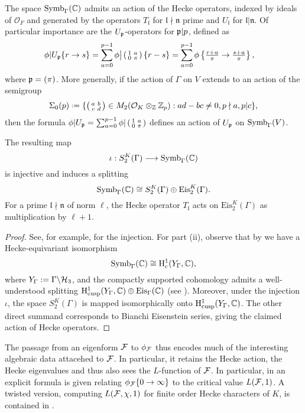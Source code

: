 \documentclass[a4paper,11pt]{article}
\newcommand{\fl}{\mathfrak{l}}
\newcommand{\cO}{\mathcal{O}}
\numberwithin{equation}{section}
\newcommand{\fn}{\mathfrak{n}}
\begin{document}
The space $\mathrm{Symb}_\Gamma(\mathbb{C})$ admits an action of the Hecke operators, indexed by ideals of $\cO_F$ and generated by the operators $T_{\fl}$ for $\fl\nmid\fn$ prime and $U_{\fl}$ for $\fl|\fn$. Of particular importance are the $U_{\mathfrak{p}}$-operators for $\mathfrak{p}|p$, defined as
\begin{align*}
	\phi|U_{\mathfrak{p}} \{r\to s\} &= \sum_{a=0}^{p-1} \phi\big|\left(\begin{smallmatrix}1 & a\\0 & \pi\end{smallmatrix}\right)\{r-s\} = \sum_{a=0}^{p-1}\phi\left\{\tfrac{r+a}{\pi} \to \tfrac{s+a}{\pi}\right\},
\end{align*}
where $\mathfrak{p} = (\pi)$. More generally, if the action of $\Gamma$ on $V$ extends to an action of the semigroup
\[
\Sigma_0(p) \defeq \{\smallmatrd{a}{b}{c}{d} \in M_2(\roi_K\otimes_{\Z}\Zp) :  ad-bc \neq 0, p\nmid a, p|c\},
\]
then the formula $\phi|U_{\mathfrak{p}} = \sum_{a = 0}^{p-1}\phi|\left(\begin{smallmatrix}1 & a\\0 & \pi\end{smallmatrix}\right)$ defines an action of $U_{\mathfrak{p}}$ on $\mathrm{Symb}_\Gamma(V)$.

\begin{proposition}
 The resulting map
    \[
        \iota : S_2^K(\Gamma) \longrightarrow \mathrm{Symb}_\Gamma(\mathbb{C})
    \]
    is injective and induces a splitting
    \[
        \mathrm{Symb}_\Gamma(\mathbb{C}) \cong S_2^K(\Gamma) \oplus \mathrm{Eis}_2^K(\Gamma).
    \]
    For a prime $\fl\nmid \fn$ of norm $\ell$, the Hecke operator $T_{\fl}$ acts on $\mathrm{Eis}_2^K(\Gamma)$ as multiplication by $\ell+1$.
\end{proposition}
\begin{proof}
    See, for example, \cite{Wil17} for the injection. For part (ii), observe that by \cite[Lemma 8.2]{BW17} we have a Hecke-equivariant isomorphism
    \[
        \mathrm{Symb}_\Gamma(\mathbb{C}) \cong \mathrm{H}^1_{\mathrm{c}}(Y_\Gamma, \mathbb{C}),
    \]
    where $Y_\Gamma := \Gamma\backslash\mathcal{H}_3$, and the compactly supported cohomology admits a well-understood splitting $\mathrm{H}^1_{\mathrm{cusp}}(Y_\Gamma,\mathbb{C}) \oplus \mathrm{Eis}_\Gamma(\mathbb{C})$ (see \cite[\S3.2.5]{Har87}). Moreover, under the injection $\iota$, the space $S_2^K(\Gamma)$ is mapped isomorphically onto $\mathrm{H}^1_{\mathrm{cusp}}(Y_\Gamma,\mathbb{C})$. The other direct summand corresponds to Bianchi Eisenstein series, giving the claimed action of Hecke operators.
\end{proof}

The passage from an eigenform $\mathcal{F}$ to $\phi_{\mathcal{F}}$ thus encodes much of the interesting algebraic data attacehed to $\mathcal{F}$. In particular, it retains the Hecke action, the Hecke eigenvalues and thus also sees the $L$-function of $\mathcal{F}$. In particular, in \cite{CrWh94} an explicit formula is given relating $\phi_{\mathcal{F}}\{0\to\infty\}$ to the critical value $L(\mathcal{F},1)$. A twisted version, computing $L(\mathcal{F},\chi,1)$ for finite order Hecke characters of $K$, is contained in \cite[Prop.\ 2.8]{Wil17}.
\end{document}
